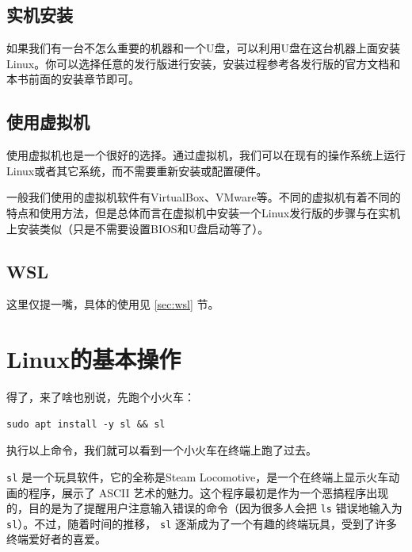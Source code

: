 \subsection{实机安装}

如果我们有一台不怎么重要的机器和一个U盘，可以利用U盘在这台机器上面安装Linux。你可以选择任意的发行版进行安装，安装过程参考各发行版的官方文档和本书前面的安装章节即可。

\subsection{使用虚拟机}

使用虚拟机也是一个很好的选择。通过虚拟机，我们可以在现有的操作系统上运行Linux或者其它系统，而不需要重新安装或配置硬件。

一般我们使用的虚拟机软件有VirtualBox、VMware等。不同的虚拟机有着不同的特点和使用方法，但是总体而言在虚拟机中安装一个Linux发行版的步骤与在实机上安装类似（只是不需要设置BIOS和U盘启动等了）。

\subsection{WSL}

这里仅提一嘴，具体的使用见 \ref{sec:wsl} 节。

\section{Linux的基本操作}

得了，来了啥也别说，先跑个小火车：

\begin{verbatim}
sudo apt install -y sl && sl
\end{verbatim}

执行以上命令，我们就可以看到一个小火车在终端上跑了过去。

\texttt{sl} 是一个玩具软件，它的全称是Steam Locomotive，是一个在终端上显示火车动画的程序，展示了 ASCII 艺术的魅力。这个程序最初是作为一个恶搞程序出现的，目的是为了提醒用户注意输入错误的命令（因为很多人会把 \texttt{ls} 错误地输入为 \texttt{sl}）。不过，随着时间的推移， \texttt{sl} 逐渐成为了一个有趣的终端玩具，受到了许多终端爱好者的喜爱。

